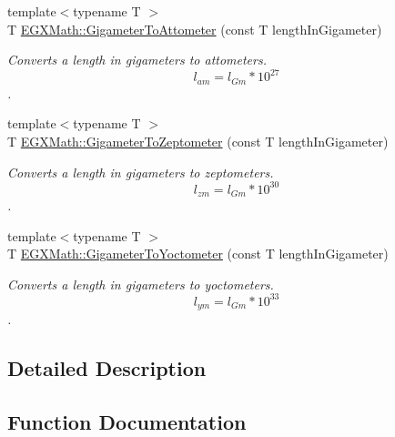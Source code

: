 \begin{DoxyCompactItemize}
{\footnotesize template$<$typename T $>$ }\\T \mbox{\hyperlink{group___e_g_x_math-_conversions-_length_conversions-_s_i-_gigameter-_s_i_ga43e0ac7c59e4df08c27ed864c64e6008}{E\+G\+X\+Math\+::\+Gigameter\+To\+Attometer}} (const T length\+In\+Gigameter)
\begin{DoxyCompactList}\small\item\em Converts a length in gigameters to attometers. \[ l_{am}=l_{Gm} * 10^{27} \]. \end{DoxyCompactList}\item 
{\footnotesize template$<$typename T $>$ }\\T \mbox{\hyperlink{group___e_g_x_math-_conversions-_length_conversions-_s_i-_gigameter-_s_i_ga5013069156df55018bc5a7f57f236f08}{E\+G\+X\+Math\+::\+Gigameter\+To\+Zeptometer}} (const T length\+In\+Gigameter)
\begin{DoxyCompactList}\small\item\em Converts a length in gigameters to zeptometers. \[ l_{zm}=l_{Gm} * 10^{30} \]. \end{DoxyCompactList}\item 
{\footnotesize template$<$typename T $>$ }\\T \mbox{\hyperlink{group___e_g_x_math-_conversions-_length_conversions-_s_i-_gigameter-_s_i_ga2eff69e0a00032c24617fde4ac30bd49}{E\+G\+X\+Math\+::\+Gigameter\+To\+Yoctometer}} (const T length\+In\+Gigameter)
\begin{DoxyCompactList}\small\item\em Converts a length in gigameters to yoctometers. \[ l_{ym}=l_{Gm} * 10^{33} \]. \end{DoxyCompactList}\end{DoxyCompactItemize}


\subsection{Detailed Description}


\subsection{Function Documentation}
\mbox{\label{group___e_g_x_math-_conversions-_length_conversions-_s_i-_gigameter-_s_i_ga43e0ac7c59e4df08c27ed864c64e6008}} 
